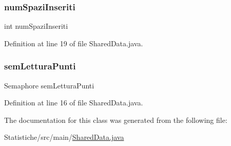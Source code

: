 \subsubsection{\texorpdfstring{num\+Spazi\+Inseriti}{numSpaziInseriti}}
{\footnotesize\ttfamily int num\+Spazi\+Inseriti\hspace{0.3cm}{\ttfamily [private]}}



Definition at line 19 of file Shared\+Data.\+java.

\mbox{\label{classmain_1_1_shared_data_a524a290baf668c047ed33ad24d49486b}} 
\subsubsection{\texorpdfstring{sem\+Lettura\+Punti}{semLetturaPunti}}
{\footnotesize\ttfamily Semaphore sem\+Lettura\+Punti}



Definition at line 16 of file Shared\+Data.\+java.



The documentation for this class was generated from the following file\+:\begin{DoxyCompactItemize}
\item 
Statistiche/src/main/\mbox{\hyperlink{_shared_data_8java}{Shared\+Data.\+java}}\end{DoxyCompactItemize}
